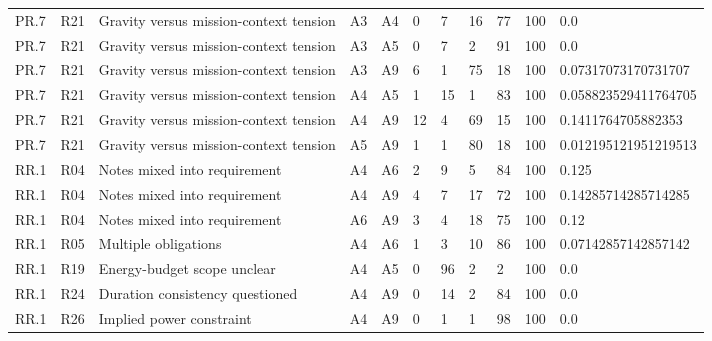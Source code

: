 \begin{tabular}{lllllllllll}
PR.7 & R21 & Gravity versus mission-context tension & A3 & A4 & 0 & 7 & 16 & 77 & 100 & 0.0 \\
PR.7 & R21 & Gravity versus mission-context tension & A3 & A5 & 0 & 7 & 2 & 91 & 100 & 0.0 \\
PR.7 & R21 & Gravity versus mission-context tension & A3 & A9 & 6 & 1 & 75 & 18 & 100 & 0.07317073170731707 \\
PR.7 & R21 & Gravity versus mission-context tension & A4 & A5 & 1 & 15 & 1 & 83 & 100 & 0.058823529411764705 \\
PR.7 & R21 & Gravity versus mission-context tension & A4 & A9 & 12 & 4 & 69 & 15 & 100 & 0.1411764705882353 \\
PR.7 & R21 & Gravity versus mission-context tension & A5 & A9 & 1 & 1 & 80 & 18 & 100 & 0.012195121951219513 \\
RR.1 & R04 & Notes mixed into requirement & A4 & A6 & 2 & 9 & 5 & 84 & 100 & 0.125 \\
RR.1 & R04 & Notes mixed into requirement & A4 & A9 & 4 & 7 & 17 & 72 & 100 & 0.14285714285714285 \\
RR.1 & R04 & Notes mixed into requirement & A6 & A9 & 3 & 4 & 18 & 75 & 100 & 0.12 \\
RR.1 & R05 & Multiple obligations & A4 & A6 & 1 & 3 & 10 & 86 & 100 & 0.07142857142857142 \\
RR.1 & R19 & Energy-budget scope unclear & A4 & A5 & 0 & 96 & 2 & 2 & 100 & 0.0 \\
RR.1 & R24 & Duration consistency questioned & A4 & A9 & 0 & 14 & 2 & 84 & 100 & 0.0 \\
RR.1 & R26 & Implied power constraint & A4 & A9 & 0 & 1 & 1 & 98 & 100 & 0.0 \\
\hline
\end{tabular}